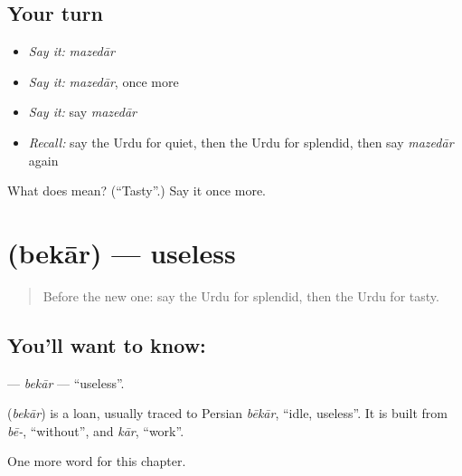 \subsection*{Your turn}
\begin{itemize}
\raggedright
  \item \emph{Say it:} \emph{mazedār}
  \item \emph{Say it:} \emph{mazedār}, once more
  \item \emph{Say it:} say \emph{mazedār}
  \item \emph{Recall:} say the Urdu for quiet, then the Urdu for splendid, then say \emph{mazedār} again
\end{itemize}

\begin{tcolorbox}[breakable,colback=teal!4,colframe=teal!35!black,title={Before you move on}]
What does  mean? (\textquotedblleft{}Tasty\textquotedblright{}.) Say it once more.
\end{tcolorbox}
\section[\texorpdfstring{\ur{بیکار} (bekār)}{بیکار (bekār)}]{ (bekār) — useless}

\label{lesson:UR-C222-bekar}



\begin{quote}
Before the new one: say the Urdu for splendid, then the Urdu for tasty.
\end{quote}

\subsection*{You'll want to know: }
\textbf{} — \emph{bekār} — \textquotedblleft{}useless\textquotedblright{}.

\begin{cousinweb}
\textbf{} (\emph{bekār}) is a loan, usually traced to Persian \emph{bēkār}, \textquotedblleft{}idle, useless\textquotedblright{}. It is built from \emph{bē-}, \textquotedblleft{}without\textquotedblright{}, and \emph{kār}, \textquotedblleft{}work\textquotedblright{}.
\end{cousinweb}

\begin{grammarlens}[title={What you've built}]
One more word for this chapter.
\end{grammarlens}


